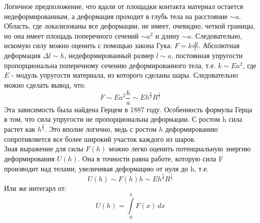 \documentclass[a4paper]{article}
\begin{document}
Логичное предположение, что вдали от площадки контакта материал остается недеформированным, а деформация проходит в глубь тела на расстояние $\sim a$. Область, где локализованы все деформации, не имеет, очевидно, четкой границы, но она имеет площадь поперечного сечений $\sim a^2$ и длину $\sim a$. Следовательно, искомую силу можно оценить с помощью закона Гука:
$F = k \frac{\Delta l }{l}$. 
Абсолютная деформация $\Delta l \sim h$, недеформированный размер $l \sim a$, постоянная упругости пропорциональна поперечному сечению деформированного тела, т.е. $k \sim Ea^2$, где $E$ - модуль упругости материала, из которого сделаны шары. Следовательно можно сделать вывод, что: 
\begin{equation}
F \sim E a^2 \frac{h}{a} \sim E h^{\frac{3}{2}} R^{\frac{1}{2}}
\label{eq2}
\end{equation}
Эта зависимость была найдена Герцем в 1887 году. Особенность формулы Герца в том, что сила упругости не пропорциональна деформации. С ростом h сила растет как $h^{\frac{3}{2}}$. Это вполне логично, ведь с ростом $h$ деформированию сопротивляется все более широкий участок каждого из шаров.
\\
Зная выражение для силы $F(h)$ можно легко оценить потенциальную энергию деформирования $U(h)$. Она в точности равна работе, которую сила F производит над телами, увеличивая деформацию от нуля до h, т.е.
\begin{equation}
U(h) \sim F(h)h \sim Eh^{\frac{5}{2}}R^{\frac{1}{2}}
\label{eq3}
\end{equation}
Или же интегарл от:
\begin{equation}
U(h)=\int\limits_0^h F(x)\,dx
\label{eq4}
\end{equation}
\end{document}
